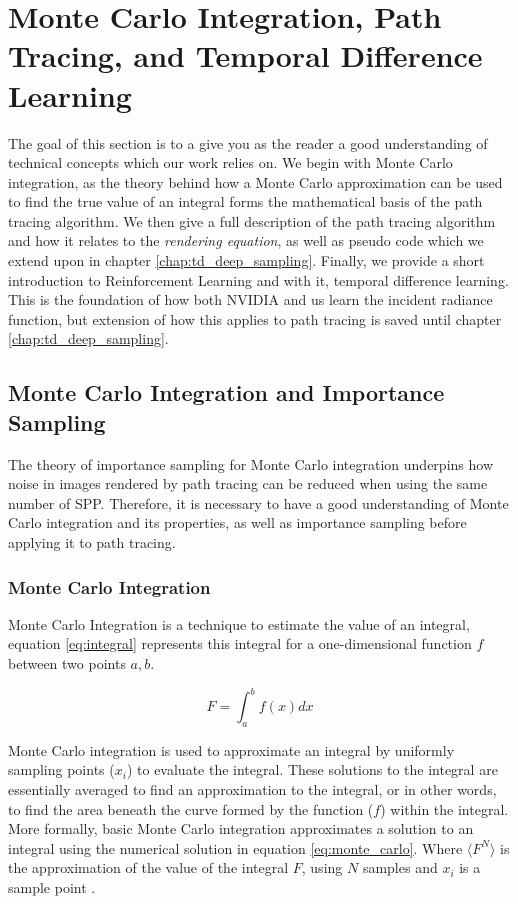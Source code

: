 \documentclass[../dissertation.tex]{subfiles}
\begin{document}
\chapter{Monte Carlo Integration, Path Tracing, and Temporal Difference Learning}
\label{chap:technical}

The goal of this section is to a give you as the reader a good understanding of technical concepts which our work relies on. We begin with Monte Carlo integration, as the theory behind how a Monte Carlo approximation can be used to find the true value of an integral forms the mathematical basis of the path tracing algorithm. We then give a full description of the path tracing algorithm and how it relates to the \textit{rendering equation}, as well as pseudo code which we extend upon in chapter \ref{chap:td_deep_sampling}. Finally, we provide a short introduction to Reinforcement Learning and with it, temporal difference learning. This is the foundation of how both NVIDIA and us learn the incident radiance function, but extension of how this applies to path tracing is saved until  chapter \ref{chap:td_deep_sampling}.

\section{Monte Carlo Integration and Importance Sampling}
\label{sec:monte_carlo}
The theory of importance sampling for Monte Carlo integration underpins how noise in images rendered by path tracing can be reduced when using the same number of SPP. Therefore, it is necessary to have a good understanding of Monte Carlo integration and its properties, as well as importance sampling before applying it to path tracing.

\subsection{Monte Carlo Integration}
\label{sec:monte_carlo_approx}
 Monte Carlo Integration is a technique to estimate the value of an integral, equation \ref{eq:integral} represents this integral for a one-dimensional function $f$ between two points $a,b$.

\begin{equation}
\label{eq:integral}
F = \int_a^b f(x) dx
\end{equation}

Monte Carlo integration is used to approximate an integral by uniformly sampling points ($x_i$) to evaluate the integral. These solutions to the integral are essentially averaged to find an approximation to the integral, or in other words, to find the area beneath the curve formed by the function ($f$) within the integral. More formally, basic Monte Carlo integration approximates a solution to an integral using the numerical solution in equation \ref{eq:monte_carlo}. Where $\langle F^N \rangle$ is the approximation of the value of the integral $F$, using $N$ samples and $x_i$ is a sample point \cite{morokoff1995quasi}.
\end{document}
